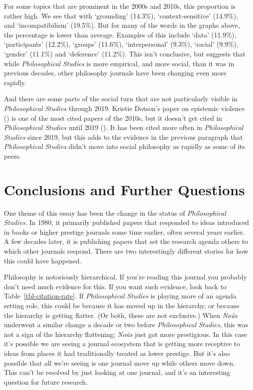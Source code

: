 \documentclass[
  11pt,
  letterpaper,
  DIV=11,
  numbers=noendperiod,
  twoside]{scrartcl}
\begin{document}
For some topics that are prominent in the 2000s and 2010s, this
proportion is rather high. We see that with `grounding' (14.3\%),
`context-sensitive' (14.9\%), and `incompatibilism' (19.5\%). But for
many of the words in the graphs above, the percentage is lower than
average. Examples of this include `data' (11.9\%), `participants'
(12.2\%), `groups' (11.6\%), `interpersonal' (9.3\%), `racial' (9.9\%),
`gender' (11.1\%) and `deference' (11.2\%). This isn't conclusive, but
suggests that while \emph{Philosophical Studies} is more empirical, and
more social, than it was in previous decades, other philosophy journals
have been changing even more rapidly.

And there are some parts of the social turn that are not particularly
visible in \emph{Philosophical Studies} through 2019. Kristie Dotson's
paper on epistemic violence () is one of the most cited papers of the 2010s, but it doesn't get
cited in \emph{Philosophical Studies} until 2019
(). It has been cited
more often in \emph{Philosophical Studies} since 2019, but this adds to
the evidence in the previous paragraph that \emph{Philosophical Studies}
didn't move into social philosophy as rapidly as some of its peers.

\section{Conclusions and Further
Questions}\label{conclusions-and-further-questions}

One theme of this essay has been the change in the status of
\emph{Philosophical Studies}. In 1980, it primarily published papers
that responded to ideas introduced in books or higher prestige journals
some time earlier, often several years earlier. A few decades later, it
is publishing papers that set the research agenda others to which other
journals respond. There are two interestingly different stories for how
this could have happened.

Philosophy is notoriously hierarchical. If you're reading this journal
you probably don't need much evidence for this. If you want such
evidence, look back to Table~\ref{tbl-citation-rate}. If
\emph{Philosophical Studies} is playing more of an agenda setting role,
this could be because it has moved up in the hierarchy, or because the
hierarchy is getting flatter. (Or both, these are not exclusive.) When
\emph{Noûs} underwent a similar change a decade or two before
\emph{Philosophical Studies}, this was not a sign of the hierarchy
flattening; \emph{Noûs} just got more prestigious. In this case it's
possible we are seeing a journal ecosystem that is getting more
receptive to ideas from places it had traditionally treated as lower
prestige. But it's also possible that all we're seeing is one journal
move up while others move down. This can't be resolved by just looking
at one journal, and it's an interesting question for future research.
\end{document}
